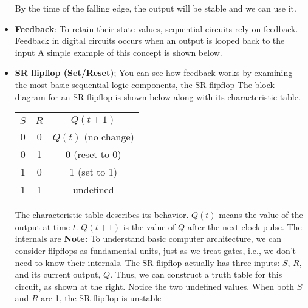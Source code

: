 \documentclass{report}
\begin{document}
\begin{itemize}
            \bigbreak \noindent 
             By the time of the falling edge, the output will be stable and we can use it.
        \item \textbf{Feedback}: To retain their state values, sequential circuits rely on feedback.
            \bigbreak \noindent 
            Feedback in digital circuits occurs when an output is looped back to the input
            \bigbreak \noindent 
            A simple example of this concept is shown below.
        \item \textbf{SR flipflop (Set/Reset)}; You can see how feedback works by examining the most basic sequential logic components, the SR flipflop
            \bigbreak \noindent 
            The block diagram for an SR flipflop is shown below along with its characteristic table.
            \bigbreak \noindent 
            \bigbreak \noindent 
            \begin{center}
                \begin{tabular}{cc|c}
                    $S$&$R$&$Q(t+1)$ \\ 
                    \hline
                    0 & 0 & $Q(t)$ (no change) \\
                    0 & 1 & 0 (reset to 0)\\ 
                    1 & 0 & 1 (set to 1)\\
                    1 & 1 & undefined
                \end{tabular}
            \end{center}
            \bigbreak \noindent 
            The characteristic table describes its behavior. 
            \bigbreak \noindent 
            $Q(t)$ means the value of the output at time $t$. $Q(t+1)$ is the value of $Q$ after the next clock pulse.
            \bigbreak \noindent 
            The internals are
            \bigbreak \noindent 
            \bigbreak \noindent 
            \textbf{Note:} To understand basic computer architecture, we can consider flipflops as fundamental units, just as we treat gates, i.e., we don't need to know their internals.
            \bigbreak \noindent 
            The SR flipflop actually has three inputs: $S$, $R $, and its current output, $Q$.
            \bigbreak \noindent 
            Thus, we can construct a truth table for this circuit, as shown at the right.
            \bigbreak \noindent 
            Notice the two undefined values. When both $S$ and $R$ are 1, the SR flipflop is unstable
            \bigbreak \noindent 

\end{itemize}
\end{document}
